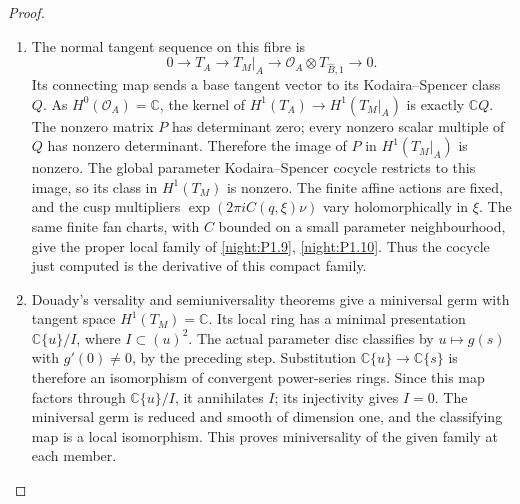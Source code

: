 \begin{proof}
\begin{enumerate}[label=\arabic*.]
\item The normal tangent sequence on this fibre is
\[
0\longrightarrow T_A\longrightarrow T_M|_A
\longrightarrow\mathcal O_A\otimes T_{\widehat B,1}
\longrightarrow0.
\]
Its connecting map sends a base tangent vector to its
Kodaira--Spencer class $Q$.  As $H^0(\mathcal O_A)=\mathbb C$,
the kernel of $H^1(T_A)\to H^1(T_M|_A)$ is exactly
$\mathbb C Q$.  The nonzero matrix $P$ has determinant zero;
every nonzero scalar multiple of $Q$ has nonzero determinant.
Therefore the image of $P$ in $H^1(T_M|_A)$ is nonzero.
The global parameter Kodaira--Spencer cocycle restricts to this
image, so its class in $H^1(T_M)$ is nonzero.
The finite affine actions are fixed, and the cusp multipliers
$\exp(2\pi iC(q,\xi)\nu)$ vary holomorphically in $\xi$.
The same finite fan charts, with $C$ bounded on a small parameter
neighbourhood, give the proper local family of
\cref{night:P1.9}, \cref{night:P1.10}.  Thus the cocycle just computed is
the derivative of this compact family.

\item Douady's versality and semiuniversality theorems
\cite[\S VII.8, pp.~598--599; \S VIII.1, pp.~599--600]{Douady1974}
give a miniversal germ with tangent space $H^1(T_M)=\mathbb C$.
Its local ring has a minimal presentation $\mathbb C\{u\}/I$,
where $I\subset(u)^2$.  The actual parameter disc classifies by
$u\mapsto g(s)$ with $g'(0)\ne0$, by the preceding step.
Substitution $\mathbb C\{u\}\to\mathbb C\{s\}$ is therefore an
isomorphism of convergent power-series rings.  Since this map factors
through $\mathbb C\{u\}/I$, it annihilates $I$; its injectivity
gives $I=0$.  The miniversal germ is reduced and smooth of dimension
one, and the classifying map is a local isomorphism.  This proves
miniversality of the given family at each member.
\end{enumerate}
\end{proof}




